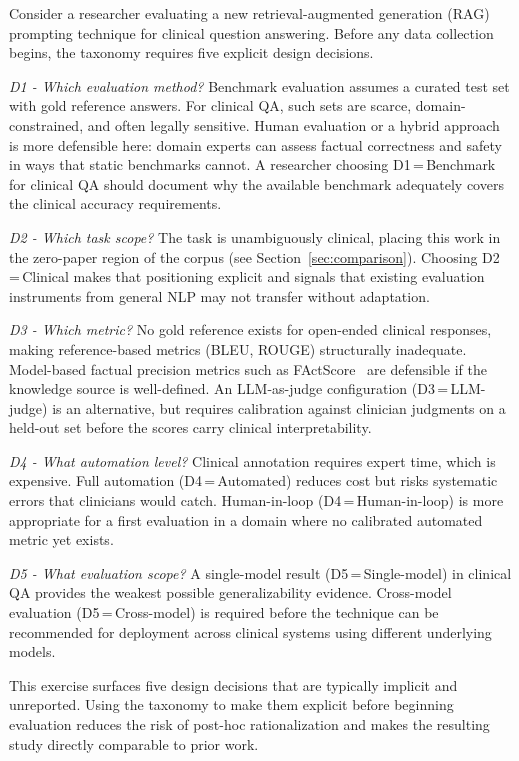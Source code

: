 \documentclass[journal]{IEEEtran}
\begin{document}
Consider a researcher evaluating a new retrieval-augmented generation (RAG)
prompting technique for clinical question answering. Before any data
collection begins, the taxonomy requires five explicit design decisions.

\textit{D1 - Which evaluation method?} Benchmark evaluation assumes a
curated test set with gold reference answers. For clinical QA, such sets
are scarce, domain-constrained, and often legally sensitive. Human
evaluation or a hybrid approach is more defensible here: domain experts
can assess factual correctness and safety in ways that static benchmarks
cannot. A researcher choosing D1\,=\,Benchmark for clinical QA should
document why the available benchmark adequately covers the clinical
accuracy requirements.

\textit{D2 - Which task scope?} The task is unambiguously clinical,
placing this work in the zero-paper region of the corpus (see
Section~\ref{sec:comparison}). Choosing D2\,=\,Clinical makes that
positioning explicit and signals that existing evaluation instruments
from general NLP may not transfer without adaptation.

\textit{D3 - Which metric?} No gold reference exists for open-ended
clinical responses, making reference-based metrics (BLEU, ROUGE)
structurally inadequate. Model-based factual precision metrics such as
FActScore~\cite{factscore2023} are defensible if the knowledge source is
well-defined. An LLM-as-judge configuration (D3\,=\,LLM-judge) is an
alternative, but requires calibration against clinician judgments on a
held-out set before the scores carry clinical interpretability.

\textit{D4 - What automation level?} Clinical annotation requires expert
time, which is expensive. Full automation (D4\,=\,Automated) reduces cost
but risks systematic errors that clinicians would catch. Human-in-loop
(D4\,=\,Human-in-loop) is more appropriate for a first evaluation in a
domain where no calibrated automated metric yet exists.

\textit{D5 - What evaluation scope?} A single-model result
(D5\,=\,Single-model) in clinical QA provides the weakest possible
generalizability evidence. Cross-model evaluation (D5\,=\,Cross-model) is
required before the technique can be recommended for deployment across
clinical systems using different underlying models.

This exercise surfaces five design decisions that are typically implicit
and unreported. Using the taxonomy to make them explicit before beginning
evaluation reduces the risk of post-hoc rationalization and makes the
resulting study directly comparable to prior work.
\end{document}
